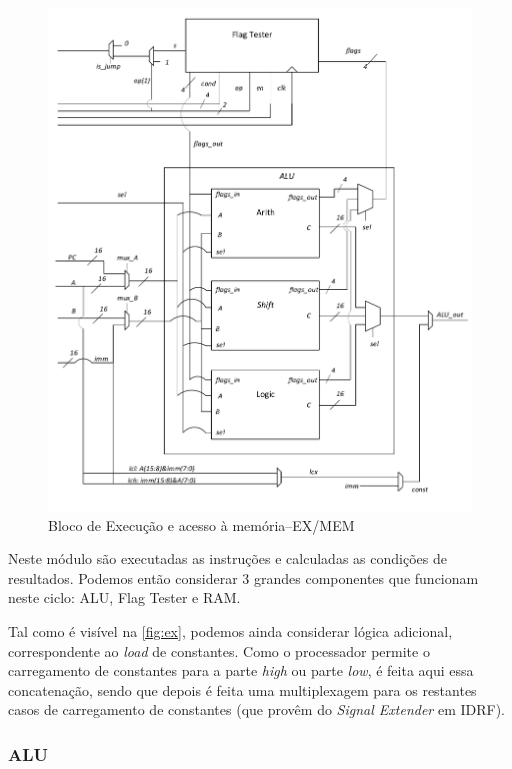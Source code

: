 \documentclass[a4paper]{article}
\begin{document}
			\begin{figure}[H]
				\centering
				\centerline{
					\includegraphics[width=.8\paperwidth]{img/EX}
				}
				\caption{Bloco de Execução e acesso à memória--EX/MEM}
				\label{fig:ex}
			\end{figure}
		
			Neste módulo são executadas as instruções e calculadas as condições de resultados. Podemos então considerar 3 grandes componentes que funcionam neste ciclo: ALU, Flag Tester e RAM.
			
			Tal como é visível na \autoref{fig:ex}, podemos ainda considerar lógica adicional, correspondente ao \textit{load} de constantes. Como o processador permite o carregamento de constantes para a parte \textit{high} ou parte \textit{low}, é feita aqui essa concatenação, sendo que depois é feita uma multiplexagem para os restantes casos de carregamento de constantes (que provêm do \textit{Signal Extender} em IDRF).
		
			\subsubsection{ALU}
				
\end{document}
